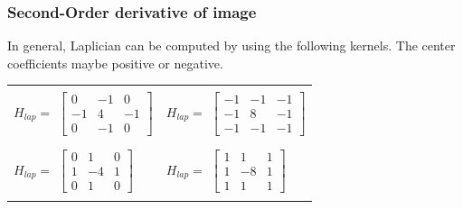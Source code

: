 \documentclass[english,11pt,table,handout]{beamer}
\begin{document}
\frame
{
	\frametitle{Second-Order derivative of image}
	
	In general, Laplician can be computed by using the following kernels. The center coefficients maybe positive or negative.
	\newline
	
	\centering
	\begin{tabular}{|l||l|}
		\hline
		& \\
		$H_{lap} = $ $\left[ 
		\begin{array}{rrr} 
		0 & -1 & 0 \\
		-1 & 4 & -1\\
		0 & -1 & 0
		\end{array}\right] $ 
		&
		$H_{lap} = $ $\left[ 
		\begin{array}{rrr} 
		-1 & -1 & -1 \\
		-1 & 8 & -1\\
		-1 & -1 & -1
		\end{array}\right] $ \\
		& \\
		\hline
		& \\
		$H_{lap} = $ $\left[ 
		\begin{array}{rrr} 
		0 & 1 & 0 \\
		1 & -4 & 1\\
		0 & 1 & 0
		\end{array}\right] $ 
		&
		$H_{lap} = $ $\left[ 
		\begin{array}{rrr} 
		1 & 1 & 1 \\
		1 & -8 & 1\\
		1 & 1 & 1
		\end{array}\right] $ \\
		& \\
		\hline
	\end{tabular}

	
	
}
\end{document}
